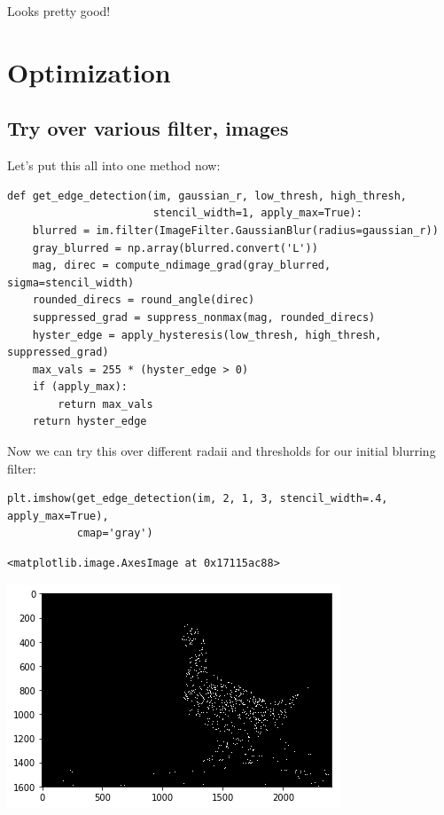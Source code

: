 \documentclass[11pt]{article}
\begin{document}
Looks pretty good!

\section*{Optimization}
\label{sec-6}
\subsection*{Try over various filter, images}
\label{sec-6-1}

Let's put this all into one method now:

\begin{verbatim}
def get_edge_detection(im, gaussian_r, low_thresh, high_thresh,
                       stencil_width=1, apply_max=True):
    blurred = im.filter(ImageFilter.GaussianBlur(radius=gaussian_r))
    gray_blurred = np.array(blurred.convert('L'))
    mag, direc = compute_ndimage_grad(gray_blurred, sigma=stencil_width)
    rounded_direcs = round_angle(direc)
    suppressed_grad = suppress_nonmax(mag, rounded_direcs)
    hyster_edge = apply_hysteresis(low_thresh, high_thresh, suppressed_grad)
    max_vals = 255 * (hyster_edge > 0)
    if (apply_max):
        return max_vals
    return hyster_edge
\end{verbatim}


Now we can try this over different radaii and thresholds for our initial
blurring filter:

\begin{verbatim}
plt.imshow(get_edge_detection(im, 2, 1, 3, stencil_width=.4, apply_max=True),
           cmap='gray')
\end{verbatim}

\begin{verbatim}
<matplotlib.image.AxesImage at 0x17115ac88>
\end{verbatim}
\includegraphics[width=.9\linewidth]{./obipy-resources/333DQi.png}
\end{document}
